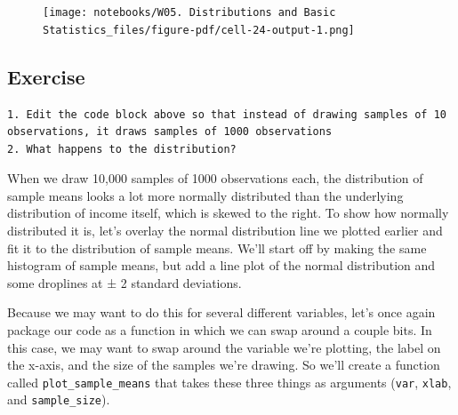 \documentclass[
  letterpaper,
  DIV=11,
  numbers=noendperiod]{scrreprt}
\begin{document}
\begin{figure}[H]

{\centering \texttt{[image: notebooks/W05. Distributions and Basic Statistics\_files/figure-pdf/cell-24-output-1.png]}

}

\end{figure}

\hypertarget{exercise-15}{%
\subsection{Exercise}\label{exercise-15}}

\begin{verbatim}
1. Edit the code block above so that instead of drawing samples of 10 observations, it draws samples of 1000 observations
2. What happens to the distribution?
\end{verbatim}

When we draw 10,000 samples of 1000 observations each, the distribution
of sample means looks a lot more normally distributed than the
underlying distribution of income itself, which is skewed to the right.
To show how normally distributed it is, let's overlay the normal
distribution line we plotted earlier and fit it to the distribution of
sample means. We'll start off by making the same histogram of sample
means, but add a line plot of the normal distribution and some droplines
at ± 2 standard deviations.

Because we may want to do this for several different variables, let's
once again package our code as a function in which we can swap around a
couple bits. In this case, we may want to swap around the variable we're
plotting, the label on the x-axis, and the size of the samples we're
drawing. So we'll create a function called \texttt{plot\_sample\_means}
that takes these three things as arguments (\texttt{var}, \texttt{xlab},
and \texttt{sample\_size}).
\end{document}
